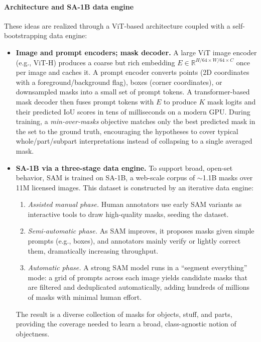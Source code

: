 \begin{enrichment}
\begin{enrichment}
		\paragraph{Architecture and SA-1B data engine}
		These ideas are realized through a ViT-based architecture coupled with a self-bootstrapping data engine:
		\begin{itemize}
			\item \textbf{Image and prompt encoders; mask decoder.} A large ViT image encoder (e.g., ViT-H) produces a coarse but rich embedding \(E \in \mathbb{R}^{H/64 \times W/64 \times C}\) once per image and caches it. A prompt encoder converts points (2D coordinates with a foreground/background flag), boxes (corner coordinates), or downsampled masks into a small set of prompt tokens. A transformer-based mask decoder then fuses prompt tokens with \(E\) to produce \(K\) mask logits and their predicted IoU scores in tens of milliseconds on a modern GPU. During training, a \emph{min-over-masks} objective matches only the best predicted mask in the set to the ground truth, encouraging the hypotheses to cover typical whole/part/subpart interpretations instead of collapsing to a single averaged mask.
			
			\item \textbf{SA-1B via a three-stage data engine.} To support broad, open-set behavior, SAM is trained on SA-1B, a web-scale corpus of \(\sim\)1.1B masks over 11M licensed images. This dataset is constructed by an iterative data engine:
			\begin{enumerate}
				\item \emph{Assisted manual phase.} Human annotators use early SAM variants as interactive tools to draw high-quality masks, seeding the dataset.
				\item \emph{Semi-automatic phase.} As SAM improves, it proposes masks given simple prompts (e.g., boxes), and annotators mainly verify or lightly correct them, dramatically increasing throughput.
				\item \emph{Automatic phase.} A strong SAM model runs in a ``segment everything'' mode: a grid of prompts across each image yields candidate masks that are filtered and deduplicated automatically, adding hundreds of millions of masks with minimal human effort.
			\end{enumerate}
			The result is a diverse collection of masks for objects, stuff, and parts, providing the coverage needed to learn a broad, class-agnostic notion of objectness.
		\end{itemize}
		

\end{enrichment}
\end{enrichment}

